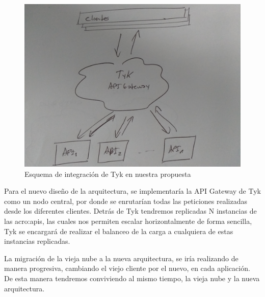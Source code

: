 \begin{figure}[H]
  \includegraphics[width=\linewidth]{src/images/03-capitulo-3/tecnologias/tyk/tyk-arq.jpg}
  \caption{Esquema de integración de Tyk en nuestra propuesta}
  \label{fig:integracion-tyk-arquitectura}
\end{figure}

Para el nuevo diseño de la arquitectura, se implementaría la API Gateway de Tyk como un nodo central, por donde se enrutarían todas las peticiones realizadas desde los diferentes clientes.  Detrás de Tyk tendremos replicadas N instancias de las \glspl{acro:api}, las cuales nos permiten escalar horizontalmente de forma sencilla, Tyk se encargará de realizar el balanceo de la carga a cualquiera de estas instancias replicadas.

La migración de la vieja nube a la nueva arquitectura, se iría realizando de manera progresiva, cambiando el viejo cliente por el nuevo, en cada aplicación.  De esta manera tendremos conviviendo al mismo tiempo, la vieja nube y la nueva arquitectura.
